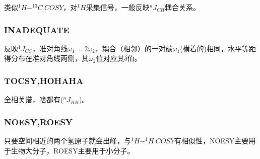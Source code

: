 类似$^1H-^{13}C \ COSY$，对$^{1}H$采集信号，一般反映$^nJ_{CH}$耦合关系。

\subsubsection{INADEQUATE}

反映$^1J_{CC}$，准对角线$\omega_1=2\omega_2$，耦合（相邻）的一对碳$\omega_1$(横着的)相同，水平等距得分布在准对角线两侧，其$\omega_2$值对应其$\delta$值。

\subsubsection{TOCSY,HOHAHA}

全相关谱，啥都有($^nJ_{HH}$)。

\subsubsection{NOESY,ROESY}

只要空间相近的两个氢原子就会出峰，与$^1H-^1H \ COSY$有相似性，NOESY主要用于生物大分子，ROESY主要用于小分子。
